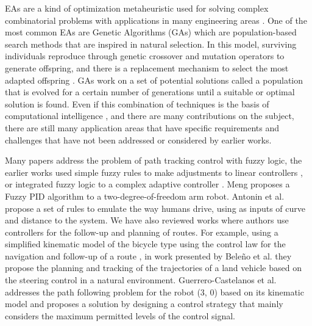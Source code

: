 \documentclass[symmetry,article,submit,moreauthors,pdftex]{Definitions/mdpi}
\begin{document}
EAs are a kind of optimization metaheuristic used for solving complex
combinatorial problems \cite{back1993overview} with applications in many
engineering areas \cite{mateos_algoritmos_2004}.  One of the most common EAs
are Genetic Algorithms (GAs) \cite{holland1992genetic} which are
population-based search methods that are inspired in natural selection. In this
model, surviving individuals reproduce through genetic crossover and mutation
operators to generate offspring, and there is a replacement mechanism to select
the most adapted offspring \cite{muelas_algoritmos_2009}. GAs work on a set of
potential solutions called a population that is evolved for a certain number of
generations until a suitable or optimal solution is found. Even if this
combination of techniques is the basis of computational intelligence
\cite{wan1970applying,engelbrecht2007computational}, and there are many
contributions on the subject, there are still many application areas that have
specific requirements and challenges that have not been addressed or considered
by earlier works.

Many papers address the problem of path tracking control with fuzzy logic, the
earlier works used simple fuzzy rules to make adjustments to linear controllers
\cite{lee_practical_2003}, or integrated fuzzy logic to a complex adaptive
controller \cite{sanchez1997adaptive}. Meng \cite{bi_control_2020} proposes a
Fuzzy PID algorithm to a two-degree-of-freedom arm robot. Antonin et al.
\cite{antonelli_fuzzy-logic-based_2007} propose a set of rules to emulate the
way humans drive, using as inputs of curve and distance to the system.  We have
also reviewed works where authors use controllers for the follow-up and
planning of routes. For example, using a simplified kinematic model of the
bicycle type using the control law for the navigation and follow-up of a route
\cite{laumond_robot_1998}, in work presented by Beleño et al.
\cite{beleno_planeacion_2014} they propose the planning and tracking of the
trajectories of a land vehicle based on the steering control in a natural
environment.  Guerrero-Castelanos et al.
\cite{guerrero-castellanos_trajectory_2014} addresses the path following
problem for the robot (3, 0) based on its kinematic model and proposes a
solution by designing a control strategy that mainly considers the maximum
permitted levels of the control signal. 
\end{document}
